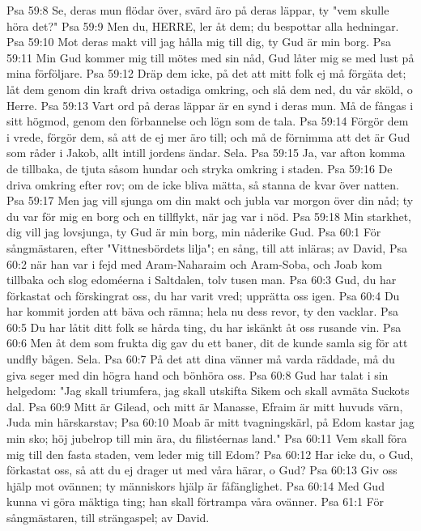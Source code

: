 Psa 59:8  Se, deras mun flödar över, svärd äro på deras läppar, ty "vem skulle höra det?"
Psa 59:9  Men du, HERRE, ler åt dem; du bespottar alla hedningar.
Psa 59:10  Mot deras makt vill jag hålla mig till dig, ty Gud är min borg.
Psa 59:11  Min Gud kommer mig till mötes med sin nåd, Gud låter mig se med lust på mina förföljare.
Psa 59:12  Dräp dem icke, på det att mitt folk ej må förgäta det; låt dem genom din kraft driva ostadiga omkring, och slå dem ned, du vår sköld, o Herre.
Psa 59:13  Vart ord på deras läppar är en synd i deras mun. Må de fångas i sitt högmod, genom den förbannelse och lögn som de tala.
Psa 59:14  Förgör dem i vrede, förgör dem, så att de ej mer äro till; och må de förnimma att det är Gud som råder i Jakob, allt intill jordens ändar. Sela.
Psa 59:15  Ja, var afton komma de tillbaka, de tjuta såsom hundar och stryka omkring i staden.
Psa 59:16  De driva omkring efter rov; om de icke bliva mätta, så stanna de kvar över natten.
Psa 59:17  Men jag vill sjunga om din makt och jubla var morgon över din nåd; ty du var för mig en borg och en tillflykt, när jag var i nöd.
Psa 59:18  Min starkhet, dig vill jag lovsjunga, ty Gud är min borg, min nåderike Gud.
Psa 60:1  För sångmästaren, efter "Vittnesbördets lilja"; en sång, till att inläras; av David,
Psa 60:2  när han var i fejd med Aram-Naharaim och Aram-Soba, och Joab kom tillbaka och slog edoméerna i Saltdalen, tolv tusen man.
Psa 60:3  Gud, du har förkastat och förskingrat oss, du har varit vred; upprätta oss igen.
Psa 60:4  Du har kommit jorden att bäva och rämna; hela nu dess revor, ty den vacklar.
Psa 60:5  Du har låtit ditt folk se hårda ting, du har iskänkt åt oss rusande vin.
Psa 60:6  Men åt dem som frukta dig gav du ett baner, dit de kunde samla sig för att undfly bågen. Sela.
Psa 60:7  På det att dina vänner må varda räddade, må du giva seger med din högra hand och bönhöra oss.
Psa 60:8  Gud har talat i sin helgedom: "Jag skall triumfera, jag skall utskifta Sikem och skall avmäta Suckots dal.
Psa 60:9  Mitt är Gilead, och mitt är Manasse, Efraim är mitt huvuds värn, Juda min härskarstav;
Psa 60:10  Moab är mitt tvagningskärl, på Edom kastar jag min sko; höj jubelrop till min ära, du filistéernas land."
Psa 60:11  Vem skall föra mig till den fasta staden, vem leder mig till Edom?
Psa 60:12  Har icke du, o Gud, förkastat oss, så att du ej drager ut med våra härar, o Gud?
Psa 60:13  Giv oss hjälp mot ovännen; ty människors hjälp är fåfänglighet.
Psa 60:14  Med Gud kunna vi göra mäktiga ting; han skall förtrampa våra ovänner.
Psa 61:1  För sångmästaren, till strängaspel; av David.
